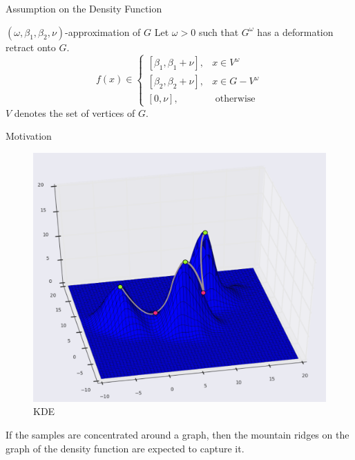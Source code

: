 \documentclass[9pt,sans-serif]{beamer}
\begin{document}
\begin{frame}{Assumption on the Density Function}
  \begin{block}{$(\omega,\beta_1,\beta_2,\nu)$-approximation of $G$}
    Let $\omega>0$ such that $G^\omega$ has a deformation retract onto $G$.
    \[
    f(x)\in
    \begin{cases}
      [\beta_1, \beta_1+\nu],&  x\in V^\omega \\
      [\beta_2, \beta_2+\nu],&  x\in G-V^\omega \\
      [0,\nu],& \text{ otherwise }
    \end{cases}
    \]
    $V$ denotes the set of vertices of $G$.
  \end{block}
\end{frame}

\begin{frame}{Motivation}
  \begin{figure}[htb]
    \centering \includegraphics[scale=0.27]{ridges}
    \caption{KDE}
  \end{figure}

  \begin{block}{}
    If the samples are concentrated around a graph, then the mountain ridges on
    the graph of the density function are expected to capture it.
  \end{block}
\end{frame}
\end{document}
